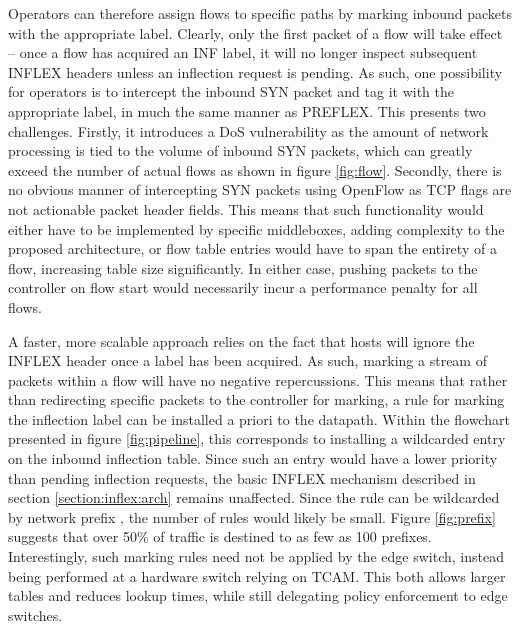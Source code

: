 Operators can therefore assign flows to specific paths by marking inbound packets with the appropriate label.
Clearly, only the first packet of a flow will take effect -- once a flow has acquired an \ac{INF} label, it will no longer inspect subsequent INFLEX headers unless an inflection request is pending.
As such, one possibility for operators is to intercept the inbound SYN packet and tag it with the appropriate label, in much the same manner as \ac{PREFLEX}.
This presents two challenges.
Firstly, it introduces a \ac{DoS} vulnerability as the amount of network processing is tied to the volume of inbound SYN packets, which can greatly exceed the number of actual flows as shown in figure \ref{fig:flow}.
Secondly, there is no obvious manner of intercepting SYN packets using OpenFlow as \ac{TCP} flags are not actionable packet header fields.
This means that such functionality would either have to be implemented by specific middleboxes, adding complexity to the proposed architecture, or flow table entries would have to span the entirety of a flow, increasing table size significantly.
In either case, pushing packets to the controller on flow start would necessarily incur a performance penalty for all flows.

A faster, more scalable approach relies on the fact that hosts will ignore the INFLEX header once a label has been acquired.
As such, marking a stream of packets within a flow will have no negative repercussions.
This means that rather than redirecting specific packets to the controller for marking, a rule for marking the inflection label can be installed a priori to the datapath.
Within the flowchart presented in figure \ref{fig:pipeline}, this corresponds to installing a wildcarded entry on the inbound inflection table.
Since such an entry would have a lower priority than pending inflection requests, the basic INFLEX mechanism described in section \ref{section:inflex:arch} remains unaffected.
Since the rule can be wildcarded by network prefix , the number of rules would likely be small. 
Figure \ref{fig:prefix} suggests that over 50\% of traffic is destined to as few as 100 prefixes.
Interestingly, such marking rules need not be applied by the edge switch, instead being performed at a hardware switch relying on \ac{TCAM}.
This both allows larger tables and reduces lookup times, while still delegating policy enforcement to edge switches.

